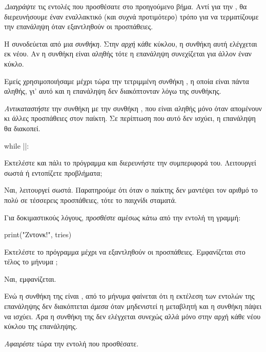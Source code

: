 \documentclass[a4paper,11pt,oneside]{book}
\begin{document}
\begin{step}
\emph{Διαγράψτε} τις εντολές που προσθέσατε στο προηγούμενο βήμα. Αντί για την , θα διερευνήσουμε έναν εναλλακτικό (και συχνά προτιμότερο) τρόπο για να τερματίζουμε την επανάληψη όταν εξαντληθούν οι προσπάθειες.

Η  συνοδεύεται από μια \emph{συνθήκη}. Στην \emph{αρχή} κάθε κύκλου, η συνθήκη αυτή ελέγχεται εκ νέου. Αν η συνθήκη είναι αληθής τότε η επανάληψη συνεχίζεται για άλλον έναν κύκλο. 

Εμείς χρησιμοποιήσαμε μέχρι τώρα την τετριμμένη συνθήκη , η οποία είναι πάντα αληθής, γι' αυτό και η επανάληψη δεν διακόπτονταν λόγω της συνθήκης.

\emph{Αντικαταστήστε} την συνθήκη  με την συνθήκη , που είναι αληθής μόνο όταν απομένουν κι άλλες προσπάθειες στον παίκτη. Σε περίπτωση που αυτό δεν ισχύει, η επανάληψη θα διακοπεί.

\begin{pyplain}
while ||:
\end{pyplain}

Εκτελέστε και πάλι το πρόγραμμα και διερευνήστε την συμπεριφορά του. Λειτουργεί σωστά ή εντοπίζετε προβλήματα;

\begin{answer}
Ναι, λειτουργεί σωστά. Παρατηρούμε ότι όταν ο παίκτης δεν μαντέψει τον αριθμό το πολύ σε τέσσερεις προσπάθειες, τότε το παιχνίδι σταματά.
\end{answer}
\end{step}

\begin{step}
Για δοκιμαστικούς λόγους, \emph{προσθέστε} αμέσως κάτω από την εντολή  τη γραμμή:

\begin{pynew}
print("Ζντονκ!", tries)
\end{pynew}

Εκτελέστε το πρόγραμμα μέχρι να εξαντληθούν οι προσπάθειες. Eμφανίζεται στο τέλος το μήνυμα ;

\begin{answer}
Ναι, εμφανίζεται.
\end{answer}

Ενώ η συνθήκη της  είναι , από το μήνυμα φαίνεται ότι η εκτέλεση των εντολών της επανάληψης δεν διακόπτεται \emph{άμεσα} όταν μηδενιστεί η μεταβλητή  και η συνθήκη πάψει να ισχύει. Άρα η συνθήκη  της  δεν ελέγχεται συνεχώς αλλά μόνο στην αρχή κάθε νέου κύκλου της επανάληψης.

\emph{Αφαιρέστε} τώρα την εντολή που προσθέσατε.
\end{step}
\end{document}

